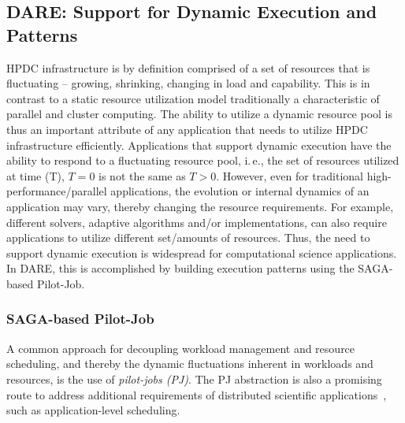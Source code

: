 \documentclass[]{svjour3}
\begin{document}
\subsection{DARE: Support for Dynamic Execution and Patterns}

HPDC infrastructure is by definition comprised of a set of resources
that is fluctuating -- growing, shrinking, changing in load and
capability. This is in contrast to a static resource utilization model
traditionally a characteristic of parallel and cluster computing. The
ability to utilize a dynamic resource pool is thus an important
attribute of any application that needs to utilize HPDC infrastructure
efficiently. Applications that support dynamic execution have the
ability to respond to a fluctuating resource pool, i.\,e., the set of
resources utilized at time (T), $T=0$ is not the same as $T>0$.
However, even for traditional high-performance/parallel applications,
the evolution or internal dynamics of an application may vary, thereby
changing the resource requirements. For example, different solvers,
adaptive algorithms and/or implementations, can also require
applications to utilize different set/amounts of resources. Thus, the
need to support dynamic execution is widespread for computational
science applications. In DARE, this is accomplished by building execution
patterns using the SAGA-based Pilot-Job.


\subsubsection{SAGA-based Pilot-Job}

A common approach for decoupling workload management and resource
scheduling, and thereby the dynamic fluctuations inherent in workloads
and resources, is the use of \emph{pilot-jobs (PJ)}. The PJ abstraction is also a
promising route to address additional requirements of distributed scientific
applications~\cite{ko-efficient,bigjob_cloudcom10}, such as application-level scheduling.
 
\end{document}
